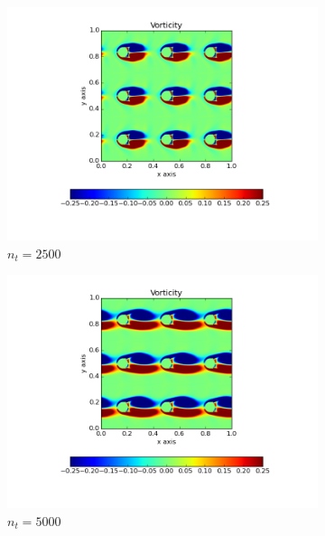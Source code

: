 \documentclass[10pt, a4paper]{article}
\begin{document}
\begin{figure}[htb!]
\centering
\begin{subfigure}{.5\textwidth}
  \centering
  \includegraphics[width=1.1\linewidth, clip=true, trim=1cm 2cm 1cm 1cm]{q5_0001}
  \caption{$n_t = 2500$}
\end{subfigure}%
\begin{subfigure}{.5\textwidth}
  \centering
  \includegraphics[width=1.1\linewidth, clip=true, trim=1cm 2cm 1cm 1cm]{q5_0002}
  \caption{$n_t = 5000$}
\end{subfigure}
\newline
\begin{subfigure}{.5\textwidth}
  \centering

\end{subfigure}
\end{figure}
\end{document}
